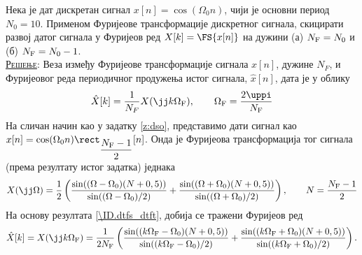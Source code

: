\PID 
Нека је дат дискретан сигнал $x[n] = \cos(\Omega_0 n)$, чији је основни период $N_0 = 10$. Применом 
Фуријеове трансформације дискретног сигнала, скицирати развој датог сигнала у Фуријеов ред 
$X[k] = \FS{x[n]}$ на дужини (а) $N_{\rm F} = N_0$ и (б) $N_{\rm F} = N_0 - 1$. \\

\textsc{\underline{Решење}:} Веза између Фуријеове трансформације сигнала $x[n]$, дужине $N_F$, и Фуријеовог реда 
периодичног продужења истог сигнала, $\hat x[n]$, дата је у облику 
\begin{equation}
    \hat X[k] = \dfrac{1}{N_F} X(\jj k \Omega_{\rm F}), \qquad \Omega_{\rm F} = \dfrac{2\uppi}{N_{\rm F}} \label{\ID.dtfs_dtft}
\end{equation}
На сличан начин као у задатку \ref{z:dso}, представимо дати сигнал као $x[n] = \cos(\Omega_0 n) \rect_{\dfrac{N_{\rm F}-1}2}[n]$.
Онда је Фуријеова трансформација тог сигнала (према резултату истог задатка) једнака
\begin{equation}
    X(\jj\Omega)
    =
    \dfrac{1}{2} \left(
    \dfrac{\sin( (\Omega - \Omega_0)(N + 0,5) ) }{ \sin((\Omega - \Omega_0)/2) }
    +
    \dfrac{\sin( (\Omega + \Omega_0)(N + 0,5) ) }{ \sin((\Omega + \Omega_0)/2) }  \right), \qquad N = \dfrac{N_{\rm F}-1}{2}
\end{equation}
На основу резултата \ref{\ID.dtfs_dtft}, добија се тражени Фуријеов ред 
\begin{equation}
    \hat X[k] = 
    X(\jj k \Omega_{\rm F} )
    =
    \dfrac{1}{2N_{\rm F}}
    \left(
    \dfrac{\sin( (k \Omega_{\rm F} - \Omega_0)(N + 0,5) ) }{ \sin((k \Omega_{\rm F} - \Omega_0)/2) }
    +
    \dfrac{\sin( (k \Omega_{\rm F} + \Omega_0)(N + 0,5) ) }{ \sin((k \Omega_{\rm F} + \Omega_0)/2) }
    \right).
\end{equation}


